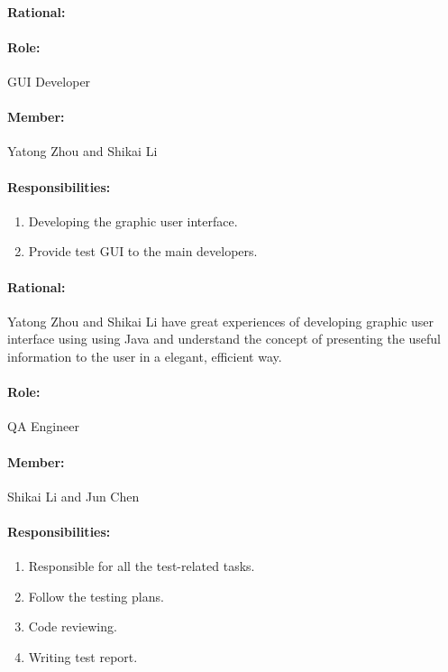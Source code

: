 \documentclass[11pt, a4paper]{report}
\begin{document}
\paragraph{Rational: \\}


\paragraph{Role: } GUI Developer
\paragraph{Member: } Yatong Zhou and Shikai Li
\paragraph{Responsibilities: }
\begin{enumerate}
	\item  Developing the graphic user interface.
	\item  Provide test GUI to the main developers.
\end{enumerate}
\paragraph{Rational: \\}
Yatong Zhou and Shikai Li have great experiences of developing graphic user interface using using Java and understand the concept of presenting the useful information to the user in a elegant, efficient way.


\paragraph{Role: } QA Engineer
\paragraph{Member: } Shikai Li and Jun Chen
\paragraph{Responsibilities: }
\begin{enumerate}
	\item  Responsible for all the test-related tasks.
	\item  Follow the testing plans.
	\item  Code reviewing.
	\item  Writing test report.
\end{enumerate}
\end{document}
